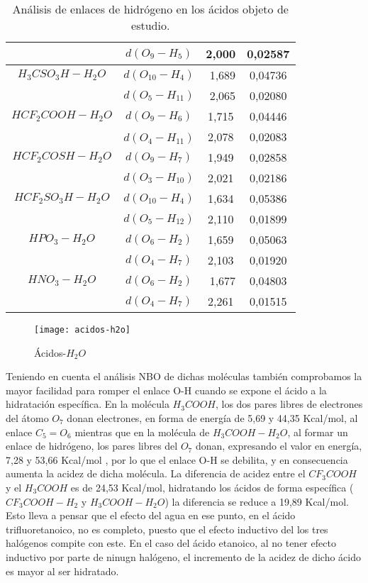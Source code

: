 \begin{table}[H]
\begin{tabular}{|c|c|c|c|}
	& $d(O_9-H_5)$	& ﻿2,000	& 0,02587 \\ \hline
 $H_3CSO_3H-H_2O$	& $d(O_{10}-H_4)$	&﻿ 1,689	& 0,04736 \\ \cline{2-4}
	& $d(O_5-H_{11})$	&﻿ 2,065 &	0,02080 \\ \hline
 $HCF_2COOH-H_2O$	& $d(O_9-H_6)$	&﻿1,715	& 0,04446 \\ \cline{2-4}
	& $d(O_4-H_{11})$﻿ & 2,078	& 0,02083 \\ \hline
 $HCF_2COSH-H_2O$	& $d(O_9-H_7)$ &1,949 & 0,02858 \\ \cline{2-4}
	& $d(O_3-H_{10})$ & 2,021 &	0,02186 \\ \hline
 $HCF_2SO_3H-H_2O$	& $d(O_{10}-H_4)$ & 1,634	& 0,05386 \\ \cline{2-4}
&	$d(O_5-H_{12})$ & 2,110	& 0,01899 \\ \hline
 $HPO_3-H_2O$	& $d(O_6-H_2)$ & 1,659	& 0,05063 \\ \cline{2-4}
	& $d(O_4-H_7)$ & 2,103	& 0,01920 \\ \hline
 $HNO_3-H_2O$	& $d(O_6-H_2)$	&﻿ 1,677	& 0,04803 \\ \cline{2-4}
	& $d(O_4-H_7)$ & 2,261	& 0,01515 \\ \hline
	\end{tabular}
\caption{Análisis de enlaces de hidrógeno en los ácidos objeto de estudio.}
\end{table}
\begin{figure}[H]
	\centering
	\texttt{[image: acidos-h2o]}
	\caption{Ácidos-$H_2O$}
\end{figure}
 Teniendo en cuenta el análisis NBO de dichas moléculas también comprobamos la mayor facilidad para romper el enlace O-H cuando se expone el ácido a la hidratación específica. En la molécula $H_3COOH$, los dos pares libres de electrones del átomo $O_7$ donan electrones, en forma de energía de 5,69 y 44,35 Kcal/mol, al enlace $C_5=O_6$ mientras que en la molécula de $H_3COOH-H_2O$, al formar un enlace de hidrógeno, los pares libres del $O_7$ donan, expresando el valor en energía, 7,28 y 53,66 Kcal/mol , por lo que el enlace O-H se debilita, y en consecuencia aumenta la acidez de dicha molécula.
 La diferencia de acidez entre el $CF_3COOH$ y el $H_3COOH$ es de 24,53 Kcal/mol, hidratando los ácidos de forma específica ($CF_3COOH-H_2$ y $H_3COOH-H_2O$) la diferencia se reduce a 19,89 Kcal/mol. Esto lleva a pensar que el efecto del agua en ese punto, en el ácido trifluoretanoico, no es completo, puesto que el efecto inductivo del los tres halógenos compite con este. En el caso del ácido etanoico, al no tener efecto inductivo por parte de ninugn halógeno, el incremento de la acidez de dicho ácido es mayor al ser hidratado.
